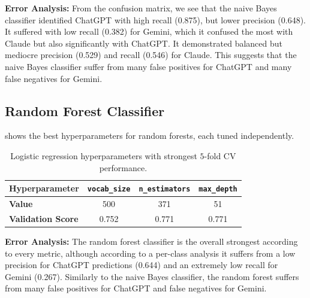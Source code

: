 \documentclass[12pt]{article}
\begin{document}
\textbf{Error Analysis:} From the confusion matrix, we see that the naive Bayes classifier identified ChatGPT with high recall (0.875), but lower precision (0.648). It suffered with low recall (0.382) for Gemini, which it confused the most with Claude but also significantly with ChatGPT. It demonstrated balanced but mediocre precision (0.529) and recall (0.546) for Claude. This suggests that the naive Bayes classifier suffer from many false positives for ChatGPT and many false negatives for Gemini.

\subsection{Random Forest Classifier}
 shows the best hyperparameters for random forests, each tuned independently.
\begin{table}[ht]
\centering
\begin{tabular}{lccc}
\hline
\textbf{Hyperparameter} & \texttt{vocab\_size} & \texttt{n\_estimators} & \texttt{max\_depth} \\
\hline
\textbf{Value} & 500 & 371 & 51 \\
\textbf{Validation Score} & 0.752 & 0.771 & 0.771 \\
\hline
\end{tabular}
\caption{Logistic regression hyperparameters with strongest $5$-fold CV performance.}
\label{tab:best-hyperparameters-rf}
\end{table}

\textbf{Error Analysis:} The random forest classifier is the overall strongest according to every metric, although according to a per-class analysis it suffers from a low precision for ChatGPT predictions (0.644) and an extremely low recall for Gemini (0.267). Similarly to the naive Bayes classifier, the random forest suffers from many false positives for ChatGPT and false negatives for Gemini.
\end{document}
